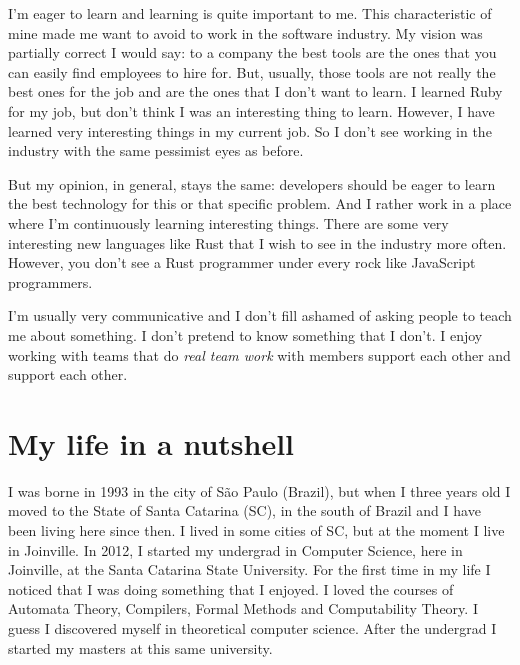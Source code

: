\documentclass[11pt,a4paper,sans]{moderncv}
\begin{document}
\medskip

I'm eager to learn and learning is quite important to me.
This characteristic of mine made me want to avoid to work in the software industry.
My vision was partially correct I would say:
to a company the best tools are the ones that you can easily find employees to hire for.
But, usually, those tools are not really the best ones for the job and are the ones that I don't want to learn.
I learned Ruby for my job, but don't think I was an interesting thing to learn.
However, I have learned very interesting things in my current job.
So I don't see working in the industry with the same pessimist eyes as before.

\medskip

But my opinion, in general, stays the same: developers should be eager to learn the best technology for this or that specific problem.
And I rather work in a place where I'm continuously learning interesting things.
There are some very interesting new languages like Rust that I wish to see in the industry more often.
However, you don't see a Rust programmer under every rock like JavaScript programmers.

\medskip

I'm usually very communicative and I don't fill ashamed of asking people to teach me about something.
I don't pretend to know something that I don't.
I enjoy working with teams that do \textit{real team work} with members support each other and support each other.

\section{My life in a nutshell}
I was borne in 1993 in the city of São Paulo (Brazil), but when I three years old I moved to the State of Santa Catarina (SC), in the south of Brazil and I have been living here since then.
I lived in some cities of SC, but at the moment I live in Joinville.
In 2012, I started my undergrad in Computer Science, here in Joinville, at the Santa Catarina State University.
For the first time in my life I noticed that I was doing something that I enjoyed.
I loved the courses of Automata Theory, Compilers, Formal Methods and Computability Theory.
I guess I discovered myself in theoretical computer science.
After the undergrad I started my masters at this same university.

\medskip
\end{document}
